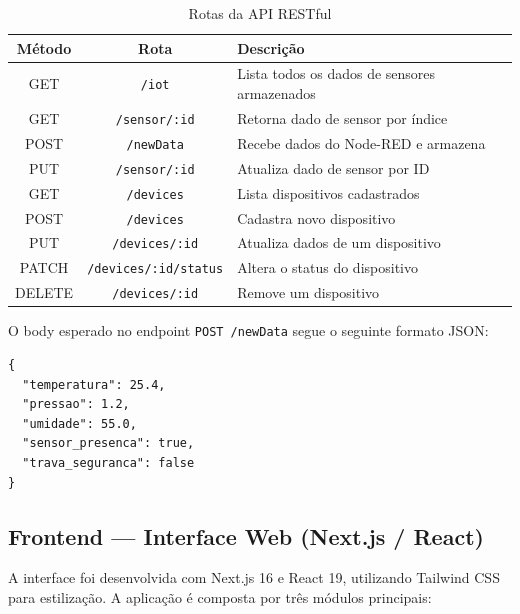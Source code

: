 \documentclass[12pt]{unisenaiclass}
\begin{document}
\begin{table}[H]
\centering
\caption{Rotas da API RESTful}
\label{tab:rotas}
\begin{tabular}{|c|c|l|}
\hline
\textbf{Método} & \textbf{Rota}              & \textbf{Descrição} \\ \hline
GET    & \texttt{/iot}               & Lista todos os dados de sensores armazenados \\ \hline
GET    & \texttt{/sensor/:id}        & Retorna dado de sensor por índice \\ \hline
POST   & \texttt{/newData}           & Recebe dados do Node-RED e armazena \\ \hline
PUT    & \texttt{/sensor/:id}        & Atualiza dado de sensor por ID \\ \hline
GET    & \texttt{/devices}           & Lista dispositivos cadastrados \\ \hline
POST   & \texttt{/devices}           & Cadastra novo dispositivo \\ \hline
PUT    & \texttt{/devices/:id}       & Atualiza dados de um dispositivo \\ \hline
PATCH  & \texttt{/devices/:id/status}& Altera o status do dispositivo \\ \hline
DELETE & \texttt{/devices/:id}       & Remove um dispositivo \\ \hline
\end{tabular}
\end{table}

O body esperado no endpoint \texttt{POST /newData} segue o seguinte formato JSON:

\begin{verbatim}
{
  "temperatura": 25.4,
  "pressao": 1.2,
  "umidade": 55.0,
  "sensor_presenca": true,
  "trava_seguranca": false
}
\end{verbatim}

\subsection{Frontend — Interface Web (Next.js / React)}

A interface foi desenvolvida com Next.js 16 e React 19, utilizando Tailwind CSS para
estilização. A aplicação é composta por três módulos principais:
\end{document}
